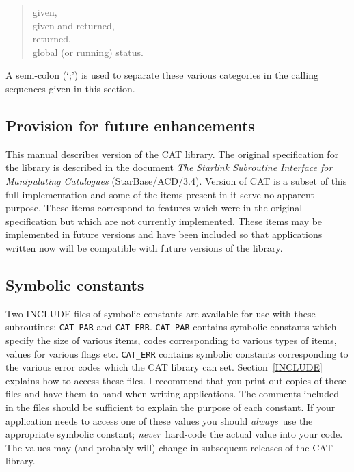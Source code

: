 \begin{verse}
given,  \\
given and returned,  \\
returned,  \\
global (or running) status.
\end{verse}

A semi-colon (`;') is used to separate these various categories in the
calling sequences given in this section.


\subsection{Provision for future enhancements}

This manual describes version \CATversion of the CAT library.  The
original specification for the library is described in the document {\it
The Starlink Subroutine Interface for Manipulating Catalogues}\/
(StarBase/ACD/3.4)\cite{STARBASE34}.  Version \CATversion of CAT is a
subset of this full implementation and some of the items present in it
serve no apparent purpose.  These items correspond to features which were
in the original specification but which are not currently implemented.
These items may be implemented in future versions and have been included
so that applications written now will be compatible with future versions
of the library.

\subsection{Symbolic constants}

Two INCLUDE files of symbolic constants are available for use with these
subroutines: {\tt CAT\_PAR} and {\tt CAT\_ERR}. {\tt CAT\_PAR} contains
symbolic constants which specify the size of various items, codes
corresponding to various types of items, values for various flags etc.
{\tt CAT\_ERR} contains symbolic constants corresponding to the various
error codes which the CAT library can set. Section~\ref{INCLUDE}
explains how to access these files. I recommend that you print out
copies of these files and have them to hand when writing applications.
The comments included in the files should be sufficient to explain the
purpose of each constant. If your application needs to access one of
these values you should {\it always}\, use the appropriate symbolic
constant; {\it never}\, hard-code the actual value into your code.
The values may (and probably will) change in subsequent releases of
the CAT library.



